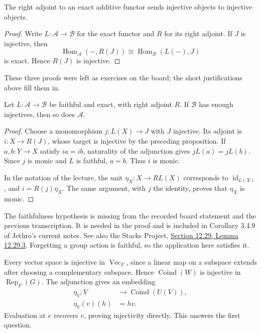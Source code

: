 \begin{proposition}
\label{proposition-adjoint-injective-4-sept}
The right adjoint to an exact additive
functor sends injective objects to
injective objects.
\end{proposition}

\begin{proof}
Write $L:\mathcal A\to\mathcal B$ for
the exact functor and $R$ for its right
adjoint. If $J$ is injective, then
$$
\operatorname{Hom}_{\mathcal A}(-,R(J))
\cong\operatorname{Hom}_{\mathcal B}(L(-),J)
$$
is exact. Hence $R(J)$ is injective.
\end{proof}

\noindent
These three proofs were left as exercises
on the board; the short justifications
above fill them in.

\begin{lemma}[Corollary]
\label{lemma-adjoint-injectives-4-sept}
Let $L:\mathcal A\to\mathcal B$ be
faithful and exact, with right adjoint
$R$. If $\mathcal B$ has enough
injectives, then so does $\mathcal A$.
\end{lemma}

\begin{proof}
Choose a monomorphism $j:L(X)\to J$
with $J$ injective. Its adjoint is
$i:X\to R(J)$, whose target is injective
by the preceding proposition.
If $a,b:Y\to X$ satisfy $ia=ib$,
naturality of the adjunction gives
$jL(a)=jL(b)$. Since $j$ is monic and
$L$ is faithful, $a=b$. Thus $i$ is monic.

In the notation of the lecture, the unit
$\eta_X:X\to RL(X)$ corresponds to
$\operatorname{id}_{L(X)}$, and
$i=R(j)\eta_X$. The same argument, with
$j$ the identity, proves that $\eta_X$
is monic.
\end{proof}

\begin{remark}
\label{remark-faithfulness-4-sept}
The faithfulness hypothesis is missing
from the recorded board statement and
the previous transcription. It is needed
in the proof and is included in
Corollary 3.4.9 of Jethro's current notes.
See also the Stacks Project,
\href{https://stacks.math.columbia.edu/tag/%
015Y}{Section 12.29, Lemma 12.29.3}.
Forgetting a group action is faithful,
so the application here satisfies it.
\end{remark}

\noindent
Every vector space is injective in
$\operatorname{Vec}_F$, since a linear
map on a subspace extends after choosing
a complementary subspace. Hence
$\operatorname{Coind}(W)$ is injective
in $\operatorname{Rep}_F(G)$.
The adjunction gives an embedding
$$
\begin{aligned}
\eta_V:V&\to\operatorname{Coind}(U(V)),\\
\eta_V(v)(h)&=hv.
\end{aligned}
$$
Evaluation at $e$ recovers $v$, proving
injectivity directly. This answers the
first question.

